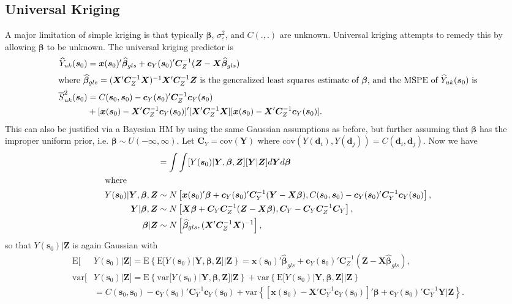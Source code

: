 \documentclass[12pt]{article}
\begin{document}
\subsection{Universal Kriging}
A major limitation of simple kriging is that typically $\bm{\beta}$, $\sigma^2_{\varepsilon}$, and $C(.,.)$ are unknown. Universal kriging attempts to remedy this by allowing $\bm{\beta}$ to be unknown. The universal kriging predictor is
\begin{align*}
\widehat{Y}_{uk}(\bm{s}_0) &= \bm{x}(\bm{s}_0)'\widehat{\bm{\beta}}_{gls} + \bm{c}_Y(\bm{s}_0)'\bm{C}_Z^{-1}(\bm{Z} - \bm{X}\widehat{\bm{\beta}}_{gls})\\
\intertext{where $\widehat{\bm{\beta}}_{gls} = (\bm{X}'\bm{C}_Z^{-1}\bm{X})^{-1}\bm{X}'\bm{C}_Z^{-1}\bm{Z}$ is the generalized least squares estimate of $\bm{\beta}$, and the MSPE of $\widehat{Y}_{uk}(\bm{s}_0)$ is}
\overline{S}_{uk}^2(\bm{s}_0) &= C(\bm{s}_0, \bm{s}_0) - \bm{c}_Y(\bm{s}_0)'\bm{C}_Z^{-1}\bm{c}_Y(\bm{s}_0)  \\
& + [\bm{x}(\bm{s}_0)  - \bm{X}'\bm{C}_Z^{-1}\bm{c}_Y(\bm{s}_0)]'[\bm{X}'\bm{C}_Z^{-1}\bm{X}][\bm{x}(\bm{s}_0)  - \bm{X}'\bm{C}_Z^{-1}\bm{c}_Y(\bm{s}_0)].
\end{align*}
This can also be justified via a Bayesian HM by using the same Gaussian assumptions as before, but further assuming that $\bm{\beta}$ has the improper uniform prior, i.e. $\bm{\beta} \sim U(-\infty, \infty)$. Let $\bm{C}_Y = \mathrm{cov}(\bm{Y})$ where $\mathrm{cov}(Y(\bm{d}_i),Y(\bm{d}_j)) = C(\bm{d}_i,\bm{d}_j)$. Now we have
\begin{align*}
[Y(\bm{s}_0)|\bm{Z}] &= \int \int [Y(\bm{s}_0)|\bm{Y}, \bm{\beta}, \bm{Z}][\bm{Y}|\bm{Z}]d\bm{Y}d\bm{\beta}\\
\intertext{where}
Y(\bm{s}_0)|\bm{Y},\bm{\beta}, \bm{Z} &\sim N\left[\bm{x}(\bm{s}_0)'\bm{\beta} + \bm{c}_Y(\bm{s}_0)'\bm{C}_Y^{-1}(\bm{Y} - \bm{X}\bm{\beta}), C(\bm{s}_0, \bm{s}_0) - \bm{c}_Y(\bm{s}_0)'\bm{C}_Y^{-1}\bm{c}_Y(\bm{s}_0)\right],\\
\bm{Y}|\bm{\beta},\bm{Z} &\sim N\left[\bm{X}\bm{\beta} + \bm{C}_Y\bm{C}_Z^{-1}(\bm{Z} - \bm{X}\bm{\beta}), \bm{C}_Y - \bm{C}_Y\bm{C}_Z^{-1}\bm{C}_Y\right],\\
\bm{\beta}|\bm{Z} &\sim N\left[\widehat{\bm{\beta}}_{gls}, (\bm{X}'\bm{C}_Z^{-1}\bm{X})^{-1}\right],
\end{align*}
so that $Y(\bm{s}_0)|\bm{Z}$ is again Gaussian with
\begin{align*}
\mathrm{E}[&Y(\bm{s}_0)|\bm{Z}] = \mathrm{E}\left\{\mathrm{E}[Y(\bm{s}_0)|\bm{Y},\bm{\beta}, \bm{Z}]|\bm{Z}\right\} = \bm{x}(\bm{s}_0)'\widehat{\bm{\beta}}_{gls} + \bm{c}_Y(\bm{s}_0)'\bm{C}_Z^{-1}(\bm{Z} - \bm{X}\widehat{\bm{\beta}}_{gls}),\\
\mathrm{var}[&Y(\bm{s}_0)|\bm{Z}]=\mathrm{E}\left\{\mathrm{var}[Y(\bm{s}_0)|\bm{Y},\bm{\beta},\bm{Z}]|\bm{Z}\right\} + \mathrm{var}\left\{\mathrm{E}[Y(\bm{s}_0)|\bm{Y},\bm{\beta},\bm{Z}]|\bm{Z}\right\}\\
&= C(\bm{s}_0, \bm{s}_0) - \bm{c}_Y(\bm{s}_0)'\bm{C}_Y^{-1}\bm{c}_Y(\bm{s}_0) + \mathrm{var}\left\{[\bm{x}(\bm{s}_0) - \bm{X}'\bm{C}_Y^{-1}\bm{c}_Y(\bm{s}_0)]'\bm{\beta} + \bm{c}_Y(\bm{s}_0)'\bm{C}_Y^{-1}\bm{Y}|\bm{Z}\right\}.
\end{align*}
\end{document}
